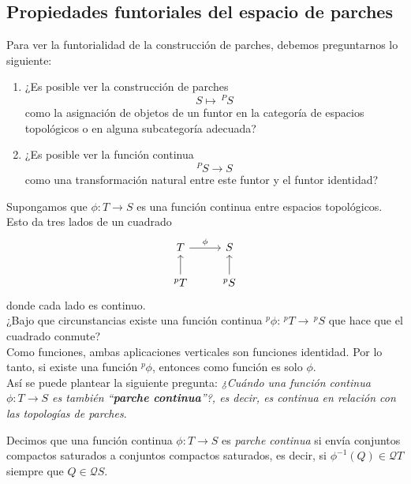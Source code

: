 \subsection{Propiedades funtoriales del espacio de parches}\label{P. funtoriales spuntos}

Para ver la funtorialidad de la construcción de parches, debemos preguntarnos lo siguiente:

\begin{enumerate}
    \item ¿Es posible ver la construcción de parches 
    \[
    S\mapsto\, ^PS
    \]
    como la asignación de objetos de un funtor en la categoría de espacios topológicos o en alguna subcategoría adecuada?

    \item ¿Es posible ver la función continua 
    \[
    ^PS\to S
    \]
    como una transformación natural entre este funtor y el funtor identidad?
\end{enumerate}

Supongamos que $\phi \colon T\to S$ es una función continua entre espacios topológicos. Esto da tres lados de un cuadrado
\[\begin{tikzcd}
	T & S \\
	{^pT} & {^pS}
	\arrow["\phi", from=1-1, to=1-2]
	\arrow[from=2-1, to=1-1]
	\arrow[from=2-2, to=1-2]
\end{tikzcd}\]
donde cada lado es continuo.\\ 

¿Bajo que circunstancias existe una función continua $^p\phi \colon \,^pT\to \,^pS$ que hace que el cuadrado conmute?\\

Como funciones, ambas aplicaciones verticales son funciones identidad. Por lo tanto, si existe una función $^p\phi$, entonces como función es solo $\phi$.\\

Así se puede plantear la siguiente pregunta: \emph{¿Cuándo una función continua $\phi\colon T\to S$ es también ``\textbf{parche continua}''?, es decir, es continua en relación con las topologías de parches}.

\begin{dfn}\label{Parchecontinua}
    Decimos que una función continua $\phi\colon T\to S$ es \emph{parche continua} si envía conjuntos compactos saturados a conjuntos compactos saturados, es decir, si $\phi ^{-1}(Q)\in \mathcal{Q}T$ siempre que $Q\in \mathcal{Q}S$. 
\end{dfn}

